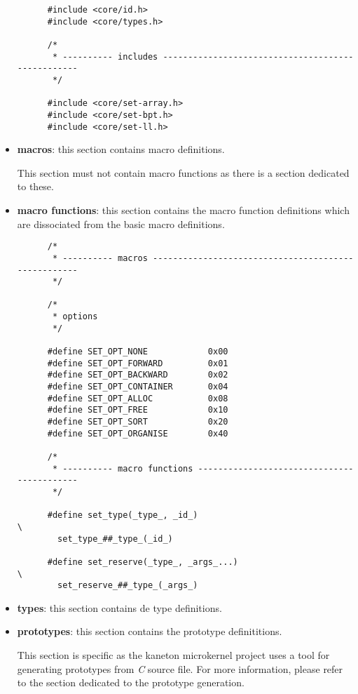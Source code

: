 \begin{itemize}
\begin{verbatim}
      #include <core/id.h>
      #include <core/types.h>

      /*
       * ---------- includes --------------------------------------------------
       */

      #include <core/set-array.h>
      #include <core/set-bpt.h>
      #include <core/set-ll.h>
    \end{verbatim}
  \item
    \textbf{macros}: this section contains macro definitions.

    \-

    This section must not contain macro functions as there is a section
    dedicated to these.
  \item
    \textbf{macro functions}: this section contains the macro function
    definitions which are dissociated from the basic macro definitions.

    \begin{verbatim}
      /*
       * ---------- macros ----------------------------------------------------
       */

      /*
       * options
       */

      #define SET_OPT_NONE            0x00
      #define SET_OPT_FORWARD         0x01
      #define SET_OPT_BACKWARD        0x02
      #define SET_OPT_CONTAINER       0x04
      #define SET_OPT_ALLOC           0x08
      #define SET_OPT_FREE            0x10
      #define SET_OPT_SORT            0x20
      #define SET_OPT_ORGANISE        0x40

      /*
       * ---------- macro functions -------------------------------------------
       */

      #define set_type(_type_, _id_)                                    \
        set_type_##_type_(_id_)

      #define set_reserve(_type_, _args_...)                            \
        set_reserve_##_type_(_args_)
    \end{verbatim}
  \item
    \textbf{types}: this section contains de type definitions.
  \item
    \textbf{prototypes}: this section contains the prototype definititions.

    \-

    This section is specific as the kaneton microkernel project uses a
    tool for generating prototypes from \textit{C} source file. For more
    information, please refer to the section dedicated to the prototype
    generation.


\end{itemize}
